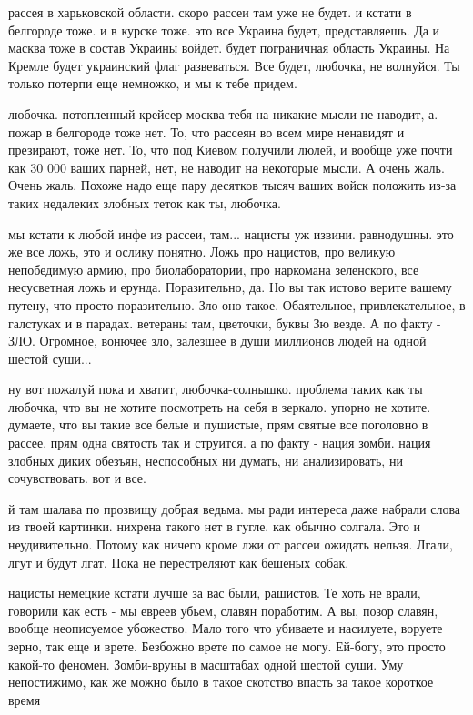 рассея в харьковской области. скоро рассеи там уже не будет. и кстати в
белгороде тоже. и в курске тоже. это все Украина будет, представляешь. Да и
масква тоже в состав Украины войдет. будет пограничная область Украины. На
Кремле будет украинский флаг развеваться. Все будет, любочка, не волнуйся. Ты
только потерпи еще немножко, и мы к тебе придем.

любочка. потопленный крейсер москва тебя на никакие мысли не наводит, а. пожар
в белгороде тоже нет. То, что рассеян во всем мире ненавидят и презирают, тоже
нет. То, что под Киевом получили люлей, и вообще уже почти как 30 000 ваших
парней, нет, не наводит на некоторые мысли. А очень жаль. Очень жаль. Похоже
надо еще пару десятков тысяч ваших войск положить из-за таких недалеких злобных
теток как ты, любочка.

мы кстати к любой инфе из рассеи, там... нацисты уж извини. равнодушны. это же
все ложь, это и ослику понятно. Ложь про нацистов, про великую непобедимую
армию, про биолаборатории, про наркомана зеленского, все несусветная ложь и
ерунда. Поразительно, да. Но вы так истово верите вашему путену, что просто
поразительно. Зло оно такое. Обаятельное, привлекательное, в галстуках и в
парадах. ветераны там, цветочки, буквы Зю везде. А по факту - ЗЛО. Огромное,
вонючее зло, залезшее в души миллионов людей на одной шестой суши...

ну вот пожалуй пока и хватит, любочка-солнышко. проблема таких как ты любочка,
что вы не хотите посмотреть на себя в зеркало. упорно не хотите. думаете, что
вы такие все белые и пушистые, прям святые все поголовно в рассее. прям одна
святость так и струится. а по факту - нация зомби. нация злобных диких обезъян,
неспособных ни думать, ни анализировать, ни сочувствовать. вот и все.

й там шалава по прозвищу добрая ведьма. мы ради интереса даже набрали слова из
твоей картинки. нихрена такого нет в гугле. как обычно солгала. Это и
неудивительно. Потому как ничего кроме лжи от рассеи ожидать нельзя. Лгали,
лгут и будут лгат. Пока не перестреляют как бешеных собак.

нацисты немецкие кстати лучше за вас были, рашистов. Те хоть не врали, говорили
как есть - мы евреев убьем, славян поработим. А вы, позор славян, вообще
неописуемое убожество. Мало того что убиваете и насилуете, воруете зерно, так
еще и врете. Безбожно врете по самое не могу. Ей-богу, это просто какой-то
феномен. Зомби-вруны в масштабах одной шестой суши. Уму непостижимо, как же
можно было в такое скотство впасть за такое короткое время

